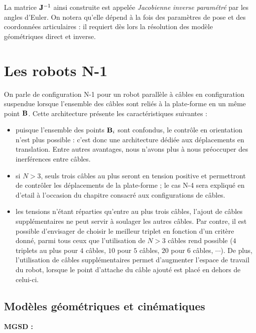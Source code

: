 La matrice ${\bf J}^{-1}$ ainsi construite est appelée {\it Jacobienne 
inverse param\'etr\'e} par les angles d'Euler. On notera qu'elle dépend à la 
fois des paramètres de pose et des coordonnées articulaires : il requiert d\`es 
lors la r\'esolution des mod\`ele g\'eom\'etriques direct et inverse.

\section{Les robots N-1} \label{chap0-2}

On parle de configuration N-1 pour un robot parall\`ele \`a c\^ables en 
configuration suspendue lorsque l'ensemble des c\^ables sont reli\'es \`a la 
plate-forme en un m\^eme point ${\bf B}$. Cette architecture pr\'esente les 
caract\'eristiques suivantes :
\begin{itemize}
  \item puisque l'ensemble des points ${\bf B}_i$ sont confondus, le contr\^ole 
en orientation n'est plus possible : c'est donc une architecture d\'edi\'ee aux 
d\'eplacements en translation. Entre autres avantages, nous n'avons plus \`a 
nous pr\'eoccuper des inerf\'erences entre c\^ables.
  \item si $N > 3$, seuls trois c\^ables au plus seront en tension positive et 
permettront de contr\^oler les d\'eplacements de la plate-forme ; le cas N-4 
sera expliqu\'e en d'etail \`a l'occasion du chapitre consacr\'e aux 
configurations de c\^ables.
  \item les tensions n'\'etant r\'eparties qu'entre au plus trois c\^ables, 
l'ajout de c\^ables suppl\'ementaires ne peut servir \`a soulager les autres 
c\^ables. Par contre, il est possible d'envisager de choisir le meilleur 
triplet 
en fonction d'un crit\`ere donn\'e, parmi tous ceux que l'utilisation de $N>3$ 
c\^ables rend possible ($4$ triplets au plus pour $4$ c\^ables, $10$ pour $5$ 
c\^ables, $20$ pour $6$ c\^ables, $\cdots$). De plus, l'utilisation de c\^ables 
suppl\'ementaires permet d'augmenter l'espace de travail du robot, lorsque le 
point d'attache du c\^able ajout\'e est plac\'e en dehors de celui-ci.
\end{itemize}

\subsection{Mod\`eles g\'eom\'etriques et cin\'ematiques}

{\bf MGSD :}\\

